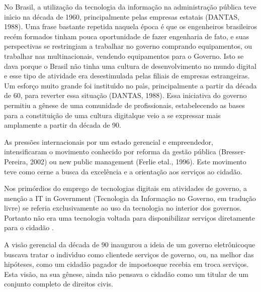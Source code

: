 \documentclass[
12pt,		%
openright,	%
twoside,  %
a4paper,			%
chapter=TITLE,		%
english,			%
french,				%
spanish,			%
brazil				%
]{USPSC-classe/USPSC}
\begin{document}
No Brasil, a utiliza\c{c}\~ao da tecnologia da informa\c{c}\~ao na administra\c{c}\~ao p\'ublica teve in\'{\i}cio na d\'ecada de 1960, principalmente pelas empresas estatais  (DANTAS, 1988). Uma frase bastante repetida naquela \'epoca \'e que os engenheiros brasileiros rec\'em formados tinham pouca oportunidade de fazer engenharia de fato, e suas perspectivas se restringiam a trabalhar no governo comprando equipamentos, ou trabalhar nas multinacionais, vendendo equipamentos para o Governo. Isto se dava porque o Brasil n\~ao tinha uma cultura de desenvolvimento no mundo digital e esse tipo de atividade era desestimulada pelas filiais de empresas estrangeiras. Um esfor\c{c}o muito grande foi institu\'{\i}do no pa\'{\i}s, principalmente a partir da d\'ecada de 60, para reverter essa situa\c{c}\~ao  (DANTAS, 1988). Essa iniciativa do governo permitiu a g\^enese de uma comunidade de profissionais, estabelecendo as bases para a constitui\c{c}\~ao de uma \textquotedbl cultura digital\textquotedbl  que veio a se expressar mais amplamente a partir da d\'ecada de 90.










As press\~oes internacionais por um estado \textquotedbl gerencial e empreendedor, intensificaram o movimento conhecido por reforma da gest\~ao p\'ublica (Bresser-Pereira, 2002) ou new public management (Ferlie etal., 1996). Este movimento teve como cerne a \textquotedbl busca da excel\^encia e a orienta\c{c}\~ao aos servi\c{c}os ao cidad\~ao.










Nos prim\'ordios do emprego de tecnologias digitais em atividades de governo, a men\c{c}\~ao a \textquotedbl IT in Government (\textquotedbl Tecnologia da Informa\c{c}\~ao no Governo, em tradu\c{c}\~ao livre) se referia exclusivamente ao uso da tecnologia no interior dos governos. Portanto n\~ao era uma tecnologia voltada para disponibilizar servi\c{c}os diretamente para o cidad\~ao .










A vis\~ao gerencial da d\'ecada de 90 inaugurou a ideia de um \textquotedbl governo eletr\^onico\textquotedbl  que buscava tratar o indiv\'{\i}duo como \textquotedbl cliente\textquotedbl  de servi\c{c}os de governo, ou, na melhor das hip\'oteses, como um cidad\~ao \textquotedbl pagador de impostos\textquotedbl  que recebia em troca servi\c{c}os. Esta vis\~ao, na sua g\^enese, ainda n\~ao pensava o cidad\~ao como um titular de um conjunto completo de direitos civis.
\end{document}

